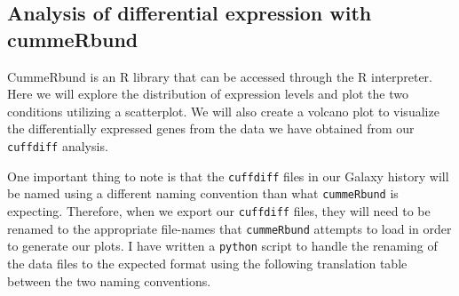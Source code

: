 \documentclass[a4paper,10pt]{article}
\begin{document}
\subsection{Analysis of differential expression with cummeRbund}
CummeRbund is an R library that can be accessed through the R interpreter.  Here we will explore the distribution of expression levels and plot the two conditions utilizing a scatterplot.  We will also create a volcano plot to visualize the differentially expressed genes from the data we have obtained from our \texttt{\footnotesize{cuffdiff}} analysis.

One important thing to note is that the \texttt{\footnotesize{cuffdiff}} files in our Galaxy history will be named using a different naming convention than what \texttt{\footnotesize{cummeRbund}} is expecting.  Therefore, when we export our \texttt{\footnotesize{cuffdiff}} files, they will need to be renamed to the appropriate file-names that \texttt{\footnotesize{cummeRbund}} attempts to load in order to generate our plots.  I have written a \texttt{\footnotesize{python}}\cite{python} script to handle the renaming of the data files to the expected format using the following translation table between the two naming conventions.\vspace{1em}\\
\renewcommand{\arraystretch}{1.5}
\end{document}
